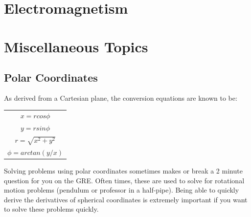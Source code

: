 \documentclass{article}
\begin{document}
\newpage
\section{Electromagnetism}






\newpage
\section{Miscellaneous Topics}


\subsection{Polar Coordinates}

As derived from a Cartesian plane, the conversion equations are known to be:

\begin{table}[h]
    \centering
    \begin{tabular}{c}
        $x = rcos\phi$ \\
        $y = rsin\phi$ \\
        $r = \sqrt{x^2 + y^2}$ \\
        $\phi = arctan(y/x)$
    \end{tabular}
\end{table}

Solving problems using polar coordinates sometimes makes or break a 2 minute question for you on the GRE. Often times, these are used to solve for rotational motion problems (pendulum or professor in a half-pipe). Being able to quickly derive the derivatives of spherical coordinates is extremely important if you want to solve these problems quickly. 
\end{document}
